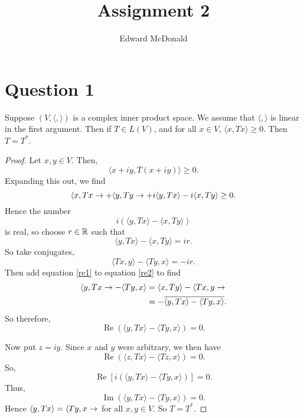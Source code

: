 \documentclass{unswmaths}
\begin{document}
\subject{Functional Analysis}
\author{Edward McDonald}
\title{Assignment 2}


\newcommand{\Real}{\operatorname{Re}}
\newcommand{\Img}{\operatorname{Im}}
\newcommand{\lan}{\langle}
\newcommand{\ran}{\rangle}
\newcommand{\Proj}{\mathbb{P}_+}
\newcommand{\isom}{\cong}


\unswtitle{}

\section*{Question 1}
\begin{theorem}
    Suppose $(V,\lan,\ran)$ is a complex inner product space. We assume that $\lan,\ran$
    is linear in the first argument. Then
    if $T \in L(V)$, and for all $x \in V$, $\lan x,Tx\ran \geq 0$. Then $T = T^*$.
\end{theorem}
\begin{proof}
    Let $x,y \in V$. Then,
    \begin{equation*}
        \lan x+iy,T(x+iy)\ran \geq 0.
    \end{equation*}
    Expanding this out, we find
    \begin{equation*}
        \lan x,Tx\ra + \lan y,Ty\ra + i\lan y,Tx\ran-i\lan x,Ty\ran \geq 0. 
    \end{equation*}
    Hence the number
    \begin{equation*}
        i(\lan y,Tx\ran-\lan x,Ty\ran)
    \end{equation*}
    is real, so choose $r \in \mathbb{R}$ such that
    \begin{equation}
    \label{re1}
        \lan y,Tx\ran -\lan x,Ty\ran = ir.
    \end{equation}
    So take conjugates,
    \begin{equation}
    \label{re2}
        \lan Tx,y\ran-\lan Ty,x\ran = -ir.
    \end{equation}
    Then add equation \ref{re1} to equation \ref{re2} to find
    \begin{align*}
        \lan y,Tx\ra - \lan Ty,x\ran &= \lan x,Ty\ran-\lan Tx,y\ra\\
        &= -\overline{\lan y,Tx\ran - \lan Ty,x\ran}.
    \end{align*}
    So therefore,
    \begin{equation*}
        \Real(\lan y,Tx\ran - \lan Ty,x\ran) = 0.
    \end{equation*}
    
    Now put $z = iy$. Since $x$ and $y$ were arbitrary, we then have
    \begin{equation*}
        \Real(\lan z,Tx\ran - \lan Tz,x\ran) = 0.
    \end{equation*}
    So,
    \begin{equation*}
        \Real[i(\lan y,Tx\ran-\lan Ty,x\ran)] = 0.
    \end{equation*}
    Thus,
    \begin{equation*}
        \Img(\lan y,Tx\ran-\lan Ty,x\ran) = 0.
    \end{equation*}
    Hence $\lan y,Tx\ran = \lan Ty,x\ra$ for all $x,y \in V$. So $T = T^*$.
\end{proof}
\end{document}
